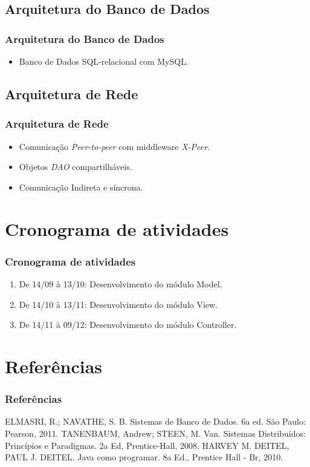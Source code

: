 \documentclass{beamer}
\begin{document}
\subsection{Arquitetura do Banco de Dados}
\begin{frame}
\frametitle{Arquitetura do Banco de Dados}
\begin{itemize}
\item Banco de Dados SQL-relacional com MySQL.
\end{itemize}
\end{frame}

\subsection{Arquitetura de Rede}
\begin{frame}
\frametitle{Arquitetura de Rede}
\begin{itemize}
\item Comunicação \emph{Peer-to-peer} com middleware \emph{X-Peer}.
\item Objetos \emph{DAO} compartilháveis.
\item Comunicação Indireta e síncrona.
\end{itemize}

\end{frame}

\section{Cronograma de atividades}
\begin{frame}
\frametitle{Cronograma de atividades}
\begin{enumerate}
\item De 14/09 à 13/10: \hfill Desenvolvimento do módulo Model.
\item De 14/10 à 13/11: \hfill Desenvolvimento do módulo View.
\item De 14/11 à 09/12: \hfill Desenvolvimento do módulo Controller.
\end{enumerate}
\end{frame}

\section{Referências}
\begin{frame}
\frametitle{Referências}

ELMASRI, R.; NAVATHE, S. B. Sistemas de Banco de Dados. 6a ed. São Paulo: Pearson, 2011.
\newline
\newline
TANENBAUM, Andrew; STEEN, M. Van. Sistemas Distribuídos: Princípios e Paradigmas. 2a Ed, Prentice-Hall, 2008.
\newline
\newline
HARVEY M. DEITEL, PAUL J. DEITEL.  Java como programar. 8a Ed., Prentice Hall - Br, 2010.
\end{frame}
\end{document}
